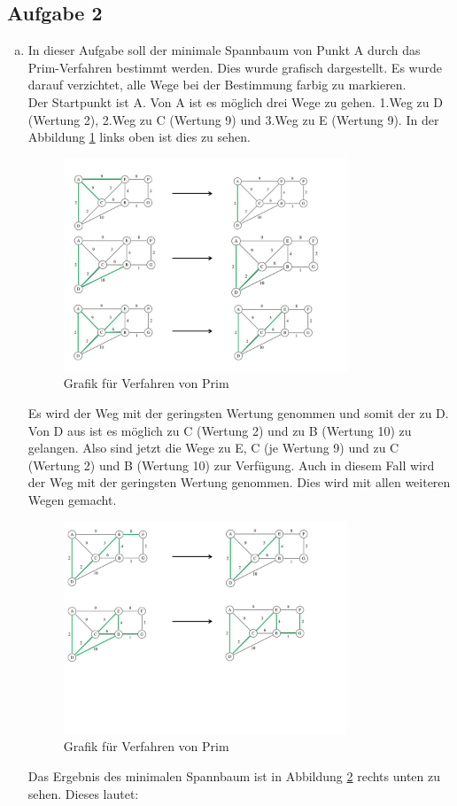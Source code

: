 \documentclass[11pt]{article}
\begin{document}
\subsection*{Aufgabe 2}
\begin{enumerate}[a)]
	\item
	In dieser Aufgabe soll der minimale Spannbaum von Punkt A durch das
	Prim-Verfahren bestimmt werden. Dies wurde grafisch dargestellt. Es wurde
	darauf verzichtet, alle Wege bei der Bestimmung farbig zu markieren.\\
	Der Startpunkt ist A. Von A ist es möglich drei Wege zu gehen.
	1.Weg zu D (Wertung 2), 2.Weg zu C (Wertung 9) und 3.Weg zu E (Wertung 9).
	In der Abbildung \ref{fig:a1} links oben ist dies zu sehen.
	\begin{figure}[h!]
		\centering
		\includegraphics[width=0.8\textwidth]{aufgabe2ateil1.png}
		\caption{Grafik für Verfahren von Prim}
		\label{fig:a1}
	\end{figure}
	Es wird der Weg mit der geringsten Wertung genommen und somit der zu D.
	Von D aus ist es möglich zu C (Wertung 2) und zu B (Wertung 10) zu gelangen.
	Also sind jetzt die Wege zu E, C (je Wertung 9) und zu C (Wertung 2) und B
	(Wertung 10) zur Verfügung. Auch in diesem Fall wird der Weg mit der geringsten
	Wertung genommen. Dies wird mit allen weiteren Wegen gemacht.
	\begin{figure}[h!]
		\centering
		\includegraphics[width=0.8\textwidth]{aufgabe2ateil2.png}
		\caption{Grafik für Verfahren von Prim}
		\label{fig:a2}
	\end{figure}
	Das Ergebnis des minimalen Spannbaum ist in Abbildung \ref{fig:a2} rechts unten
	zu sehen. Dieses lautet:  
	

\end{enumerate}
\end{document}
